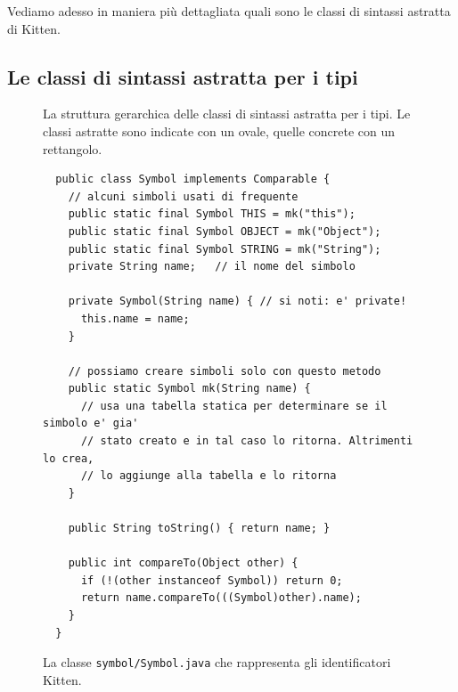 Vediamo adesso in maniera pi\`u dettagliata quali sono le classi di
sintassi astratta di Kitten.
%
\subsection{Le classi di sintassi astratta per i tipi}
  \label{subsec:types_abstract}
%
\begin{figure}[t]
\begin{center}
\end{center}
\caption{La struttura gerarchica delle classi di sintassi astratta per
         i tipi. Le classi astratte sono indicate con un
         ovale, quelle concrete con un rettangolo.}
  \label{fig:types_hierarchy}
\end{figure}

\begin{figure}[t]
\begin{verbatim}
  public class Symbol implements Comparable {
    // alcuni simboli usati di frequente
    public static final Symbol THIS = mk("this");
    public static final Symbol OBJECT = mk("Object");
    public static final Symbol STRING = mk("String");
    private String name;   // il nome del simbolo

    private Symbol(String name) { // si noti: e' private!
      this.name = name;
    }

    // possiamo creare simboli solo con questo metodo
    public static Symbol mk(String name) {
      // usa una tabella statica per determinare se il simbolo e' gia'
      // stato creato e in tal caso lo ritorna. Altrimenti lo crea,
      // lo aggiunge alla tabella e lo ritorna
    }

    public String toString() { return name; }

    public int compareTo(Object other) {
      if (!(other instanceof Symbol)) return 0;
      return name.compareTo(((Symbol)other).name);
    }
  }
\end{verbatim}
\caption{La classe \texttt{symbol/Symbol.java} che rappresenta gli identificatori Kitten.}
  \label{fig:symbol.Symbol}
\end{figure}

